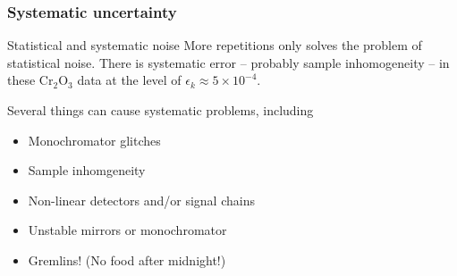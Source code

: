 \documentclass[10pt, xcolor=x11names, compress]{beamer}
\begin{document}
\begin{frame}
  \frametitle{Systematic uncertainty}

  \begin{block}{Statistical and systematic noise}
    More repetitions only solves the problem of statistical noise.
    There is systematic error -- probably sample inhomogeneity -- in
    these Cr$_2$O$_3$ data at the level of $\epsilon_k \approx 5\times
    10^{-4}$.
  \end{block}

  \bigskip

  Several things can cause systematic problems, including
  \begin{itemize}
  \item Monochromator glitches
  \item Sample inhomgeneity
  \item Non-linear detectors and/or signal chains
  \item Unstable mirrors or monochromator
  \item Gremlins!  (No food after midnight!)
  \end{itemize}
\end{frame}
\end{document}
